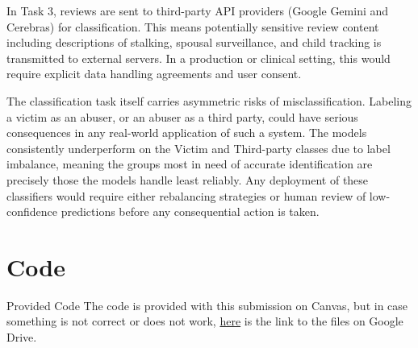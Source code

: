 \documentclass[12pt]{article}
\begin{document}
In Task 3, reviews are sent to third-party API providers (Google Gemini 
and Cerebras) for classification. This means potentially sensitive review
content including descriptions of stalking, spousal surveillance, and 
child tracking is transmitted to external servers. In a production or 
clinical setting, this would require explicit data handling agreements 
and user consent.

The classification task itself carries asymmetric risks of misclassification. 
Labeling a victim as an abuser, or an abuser as a third party, could have 
serious consequences in any real-world application of such a system. The 
models consistently underperform on the Victim and Third-party classes 
due to label imbalance, meaning the groups most in need of accurate 
identification are precisely those the models handle least reliably. 
Any deployment of these classifiers would require either rebalancing 
strategies or human review of low-confidence predictions before any 
consequential action is taken.

\section{Code}

\begin{aside}{Provided Code}
    The code is provided with this submission on Canvas, but in case something is not correct 
    or does not work, \href{https://drive.google.com/drive/folders/1W0iUTP5_-hPrcNcUi155nI08rTYZorFQ?usp=sharing}{here} is the link to the files on Google Drive.
\end{aside}
\end{document}
